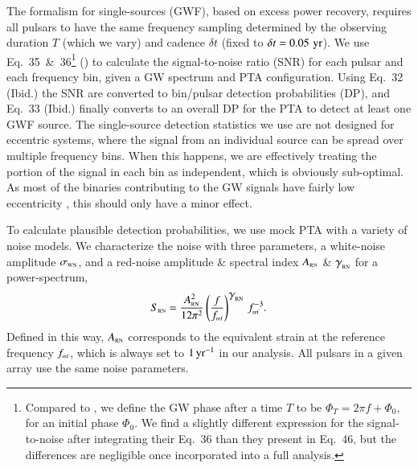 \documentclass[useAMS, usenatbib]{mnras}  %
\newcommand{\rnamp}{A_\trt{RN}}
\newcommand{\rnind}{{\protect\scalebox{1.1}{\ensuremath{\gamma{}}}_\trt{RN}}}
\newcommand{\wnrms}{\sigma_\trt{WN}}
\begin{document}
        The formalism for single-sources (GWF), based on excess power recovery, requires all pulsars to have the same frequency sampling determined by the observing duration $T$ (which we vary) and cadence $\delta t$ (fixed to $\delta t = 0.05 \, \,\mathrm{yr}$).  We use Eq.~35~\&~36\footnote{Compared to , we define the GW phase after a time $T$ to be $\Phi_T = 2\pi f + \Phi_0$, for an initial phase $\Phi_0$.  We find a slightly different expression for the signal-to-noise after integrating their Eq.~36 than they present in Eq.~46, but the differences are negligible once incorporated into a full analysis.} () to calculate the signal-to-noise ratio (SNR) for each pulsar and each frequency bin, given a GW spectrum and PTA configuration.  Using Eq.~32 (Ibid.) the SNR are converted to bin/pulsar detection probabilities (DP), and Eq.~33 (Ibid.) finally converts to an overall DP for the PTA to detect at least one GWF source.  The single-source detection statistics we use are not designed for eccentric systems, where the signal from an individual source can be spread over multiple frequency bins.  When this happens, we are effectively treating the portion of the signal in each bin as independent, which is obviously sub-optimal.  As most of the binaries contributing to the GW signals have fairly low eccentricity \citep[see, e.g.~; and][]{paper2}, this should only have a minor effect.

        To calculate plausible detection probabilities, we use mock PTA with a variety of noise models.  We characterize the noise with three parameters, a white-noise amplitude $\wnrms$, and a red-noise amplitude \& spectral index $\rnamp$ \& $\rnind$ for a power-spectrum,
        \begin{equation}
        S_\trt{RN} = \frac{\rnamp^2}{12\pi^2} \left(\frac{f}{f_\trt{ref}}\right)^{\rnind} \, f_\trt{ref}^{-3}.
        \label{eq:red-noise}
        \end{equation}
        Defined in this way, $\rnamp$ corresponds to the equivalent strain at the reference frequency $f_{\textrm{\tiny{ref}}}$, which is always set to $1 \, \textrm{yr}^{-1}$ in our analysis.  All pulsars in a given array use the same noise parameters.
\end{document}
